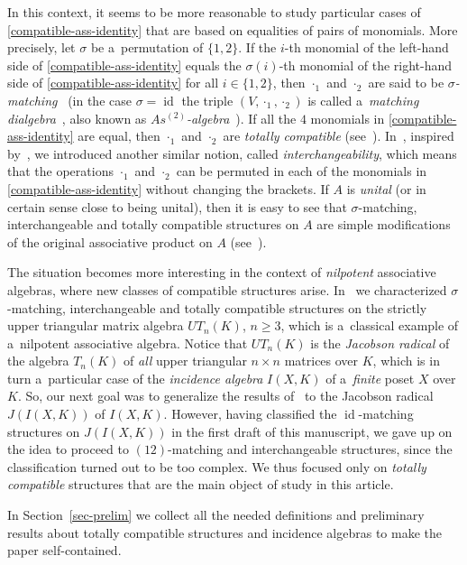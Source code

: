 \documentclass{jonasart}
\newcommand{\sg}{\sigma}
\DeclareMathOperator{\id}{id}
\begin{document}
	In this context, it seems to be more reasonable to study particular cases of \eqref{compatible-ass-identity} that are based on equalities of pairs of monomials. More precisely, let $\sg$ be a~permutation of $\{1,2\}$. If the $i$-th monomial of the left-hand side of \eqref{compatible-ass-identity} equals the $\sg(i)$-th monomial of the right-hand side of \eqref{compatible-ass-identity} for all $i\in\{1,2\}$, then $\cdot_1$ and $\cdot_2$ are said to be \textit{$\sg$-matching}~\cite{zgg23} (in the case $\sg=\id$ the triple $(V,\cdot_1,\cdot_2 )$ is called a~\textit{matching dialgebra}~\cite{zbg12}, also known as \textit{$As^{(2)}$-algebra}~\cite{Zinbiel}). If all the $4$ monomials in \eqref{compatible-ass-identity} are equal, then $\cdot_1$ and $\cdot_2$ are \textit{totally compatible} (see~\cite{Zhang13,zbg13}). In~\cite{Khr2024}, inspired by~\cite{Strohmayer08}, we introduced another similar notion, called \textit{interchangeability}, which means that the operations $\cdot_1$ and $\cdot_2$ can be permuted in each of the monomials in \eqref{compatible-ass-identity} without changing the brackets. If $A$ is \textit{unital} (or in certain sense close to being unital), then it is easy to see that $\sg$-matching, interchangeable and totally compatible structures on $A$ are simple modifications of the original associative product on $A$ (see~\cite{Khr2024}).

	The situation becomes more interesting in the context of \textit{nilpotent} associative algebras, where new classes of compatible structures arise. In~\cite{Khr2024b} we characterized $\sg$-matching, interchangeable and totally compatible structures on the strictly upper triangular matrix algebra $UT_n (K)$, $n\ge 3$, which is a~classical example of a~nilpotent associative algebra. Notice that $UT_n (K)$ is the \textit{Jacobson radical} of the algebra $T_n (K)$ of \textit{all} upper triangular $n\times n$ matrices over $K$, which is in turn a~particular case of the \textit{incidence algebra} $I(X,K)$ of a~\textit{finite} poset $X$ over $K$. So, our next goal was to generalize the results of~\cite{Khr2024b} to the Jacobson radical $J(I(X,K))$ of $I(X,K)$. However, having classified the $\id$-matching structures on $J(I(X,K))$ in the first draft of this manuscript, we gave up on the idea to proceed to $(12)$-matching and interchangeable structures, since the classification turned out to be too complex. We thus focused only on \textit{totally compatible} structures that are the main object of study in this article.

	In Section~\ref{sec-prelim} we collect all the needed definitions and preliminary results about totally compatible structures and incidence algebras to make the paper self-contained.
\end{document}
